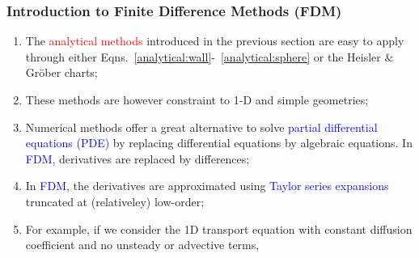 \documentclass[10pt,compress]{beamer}
\newcommand{\red}{\textcolor{red}}
\newcommand{\blue}{\textcolor{blue}}
\begin{document}
\begin{frame}
  \frametitle{Introduction to Finite Difference Methods (FDM)}
  \begin{enumerate}
     \item<1-> The \red{analytical methods} introduced in the previous section are easy to apply through either Eqns.~\ref{analytical:wall}-~\ref{analytical:sphere} or the Heisler $\&$ Gr\"ober charts;
     \item<1-> These methods are however constraint to 1-D and simple geometries;
     \item<2-> Numerical methods offer a great alternative to solve \blue{partial differential equations (PDE)} by replacing differential equations by algebraic equations. In \blue{FDM}, derivatives are replaced by differences; 
     \item<3-> In \blue{FDM}, the derivatives are approximated using \blue{Taylor series expansions} truncated at (relativeley) low-order;
     \item<3-> For example, if we consider the 1D transport equation with constant diffusion coefficient and no unsteady or advective terms,
  \end{enumerate}
\end{frame}
\end{document}
